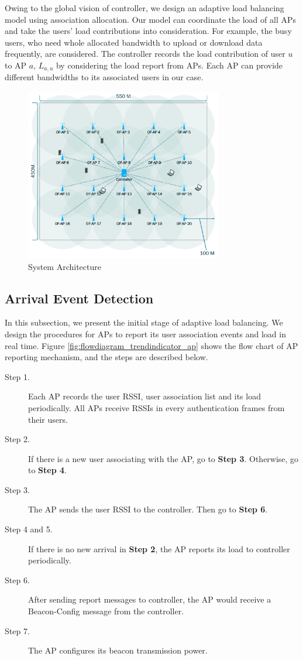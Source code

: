 Owing to the global vision of controller, we design an adaptive load balancing model using association allocation. Our model can coordinate the load of all APs and take the users' load contributions into consideration. For example, the busy users, who need whole allocated bandwidth to upload or download data frequently, are considered. The controller records the load contribution of user $u$ to AP $a$, $L_{a,u}$ by considering the load report from APs. Each AP can provide different bandwidths to its associated users in our case.


\begin{figure}[tbp]
\begin{center}
\includegraphics[width=3.4in]{images/scheme1.pdf}
\end{center}
\caption{System Architecture}
\label{fig:scheme1}
\end{figure}

\subsection{Arrival Event Detection}\label{section:3.2}
In this subsection, we present the initial stage of adaptive load balancing. We design the procedures for APs to report its user association events and load in real time. Figure \ref{fig:flowdiagram_trendindicator_ap} shows the flow chart of AP reporting mechanism, and the steps are described below.

\begin{description}
  \item [Step 1.] Each AP records the user RSSI, user association list and its load periodically. All APs receive RSSIs in every authentication frames from their users.
  \item [Step 2.] If there is a new user associating with the AP, go to \textbf{Step 3}. Otherwise, go to \textbf{Step 4}.
  \item [Step 3.] The AP sends the user RSSI to the controller. Then go to \textbf{Step 6}.
  \item [Step 4 and 5.] If there is no new arrival in \textbf{Step 2}, the AP reports its load to controller periodically.
  \item [Step 6.] After sending report messages to controller, the AP would receive a Beacon-Config message from the controller.
  \item [Step 7.] The AP configures its beacon transmission power.
\end{description}

